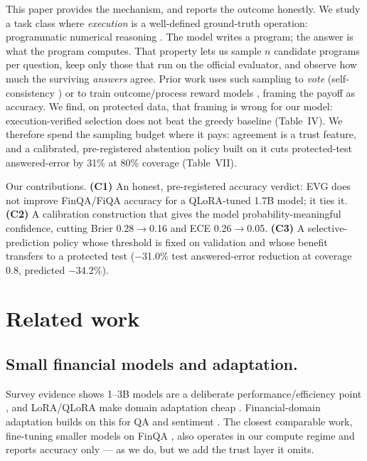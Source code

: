 \documentclass[conference]{IEEEtran}
\begin{document}
This paper provides the mechanism, and reports the outcome honestly. We study a task class
where \emph{execution} is a well-defined ground-truth operation: programmatic numerical
reasoning \citep{chen2021finqa}. The model writes a program; the answer is what the
program computes. That property lets us sample $n$ candidate programs per question, keep
only those that run on the official evaluator, and observe how much the surviving \emph{answers}
agree. Prior work uses such sampling to \emph{vote} (self-consistency \citep{wang2023selfconsistency})
or to train outcome/process reward models \citep{lightman2024verify,wang2024mathshepherd},
framing the payoff as accuracy. We find, on protected data, that framing is wrong for our
model: execution-verified selection does not beat the greedy baseline (Table~IV).
We therefore spend the sampling budget where it pays: agreement is a trust feature, and a
calibrated, pre-registered abstention policy built on it cuts protected-test answered-error
by 31\% at 80\% coverage (Table~VII).

Our contributions. \textbf{(C1)} An honest, pre-registered accuracy verdict: EVG does not
improve FinQA/FiQA accuracy for a QLoRA-tuned 1.7B model; it ties it. \textbf{(C2)} A
calibration construction that gives the model probability-meaningful confidence, cutting
Brier 0.28$\rightarrow$0.16 and ECE 0.26$\rightarrow$0.05. \textbf{(C3)} A selective-prediction
policy whose threshold is fixed on validation and whose benefit transfers to a protected
test ($-$31.0\% test answered-error reduction at coverage 0.8, predicted $-$34.2\%).

\section{Related work}
\subsection{Small financial models and adaptation.}
Survey evidence shows 1--3B models are a deliberate performance/efficiency point
\citep{subramanian2025slms,abdin2024phi3,zhang2024tinyllama}, and LoRA/QLoRA make domain
adaptation cheap \citep{hu2022lora,dettmers2023qlora}. Financial-domain adaptation builds
on this for QA and sentiment \citep{phogat2024finetuning,yang2023fingpt,yang2023investlm,wu2023bloomberg,huang2020finbert,shi2025kronos}.
The closest comparable work, fine-tuning smaller models on FinQA \citep{phogat2024finetuning},
also operates in our compute regime and reports accuracy only --- as we do, but we add the
trust layer it omits.
\end{document}
